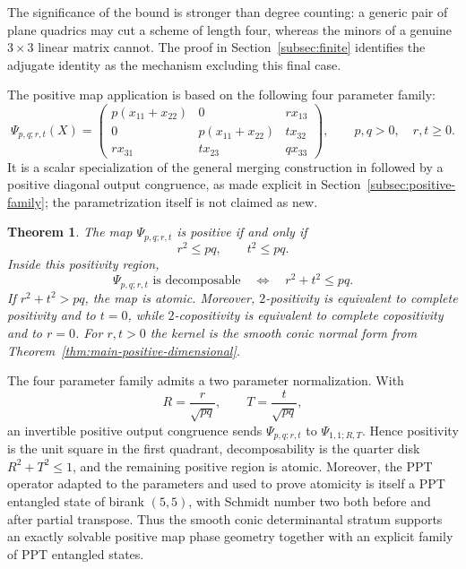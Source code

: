 \documentclass[11pt]{amsart}
\newcommand{\chg}[1]{#1}
\theoremstyle{plain}
\newtheorem{theorem}{Theorem}[section]
\theoremstyle{definition}
\theoremstyle{remark}
\begin{document}
The significance of the bound is stronger than degree counting: a generic pair of plane quadrics may cut a scheme of length four, whereas the minors of a genuine $3\times3$ linear matrix cannot. The proof in Section~\ref{subsec:finite} identifies the adjugate identity as the mechanism excluding this final case.

\chg{The positive map application is based on the following four parameter family:}
\begin{equation}\label{eq:Psi}
\Psi_{p,q;r,t}(X)=
\begin{pmatrix}
 p(x_{11}+x_{22})&0&r x_{13}\\
 0&p(x_{11}+x_{22})&t x_{32}\\
 r x_{31}&t x_{23}&q x_{33}
\end{pmatrix},
\qquad p,q>0,\quad r,t\ge0.
\end{equation}
It is a scalar specialization of the general merging construction in \cite{MarciniakRutkowski2017} followed by a positive diagonal output congruence, as made explicit in Section~\ref{subsec:positive-family}; the parametrization itself is not claimed as new.

\begin{theorem}\label{thm:main-positive-map}
The map $\Psi_{p,q;r,t}$ is positive if and only if
\[
r^2\le pq,\qquad t^2\le pq.
\]
Inside this positivity region,
\[
\Psi_{p,q;r,t}\text{ is decomposable}
\quad\Longleftrightarrow\quad
r^2+t^2\le pq.
\]
If $r^2+t^2>pq$, the map is atomic. Moreover, \(2\)-positivity is equivalent to complete positivity and to $t=0$, while \(2\)-copositivity is equivalent to complete copositivity and to $r=0$. For {$r,t>0$} the kernel is the \chg{smooth conic} normal form from Theorem~\ref{thm:main-positive-dimensional}.
\end{theorem}

The \chg{four parameter} family admits a \chg{two parameter} normalization. With
\[
R=\frac r{\sqrt{pq}},\qquad T=\frac t{\sqrt{pq}},
\]
an invertible positive output congruence sends $\Psi_{p,q;r,t}$ to $\Psi_{1,1;R,T}$. Hence positivity is the unit square in the first quadrant, decomposability is the quarter disk $R^2+T^2\le1$, and the remaining positive region is atomic. Moreover, the PPT operator \chg{adapted to the parameters} and used to prove atomicity is itself a PPT entangled state of birank $(5,5)$, with Schmidt number two both before and after partial transpose. Thus the \chg{smooth conic determinantal stratum} supports an exactly solvable positive map phase geometry together with an explicit \chg{family of PPT entangled states}.
\end{document}
